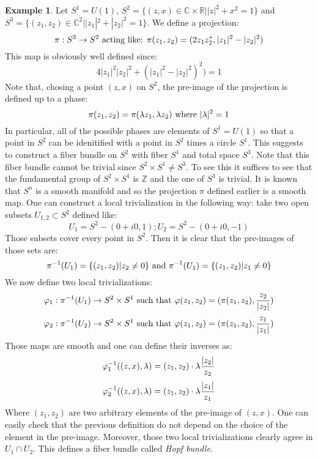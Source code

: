 \documentclass[12pt,a4paper]{report}
\theoremstyle{definition}
\theoremstyle{Theorem}
\theoremstyle{definition}
\newtheorem{Ex}[Def]{Example}
\theoremstyle{definition}
\begin{document}
	\begin{Ex}\label{Ex_3.1.3}
		Let $S^1=U(1)$, $S^2=\{(z,x)\in\mathbb{C}\times\mathbb{R}||z|^2+x^2=1\}$ and $S^3=\{(z_1,z_2)\in\mathbb{C}^2||z_1|^2+|z_2|^2=1\}$. We define a projection:
		$$\pi:S^3\rightarrow S^2\hbox{ acting like: }\pi(z_1,z_2)=(2z_1z_2^*,|z_1|^2-|z_2|^2)$$
		This map is obviously well defined since:
		$$4|z_1|^2|z_2|^2+(|z_1|^2-|z_2|^2)^2)=1$$
		Note that, chosing a point $(z,x)$ on $S^2$, the pre-image of the projection is defined up to a phase:
		$$\pi(z_1,z_2)=\pi(\lambda z_1,\lambda z_2)\hbox{ where }|\lambda|^2=1$$
		In particular, all of the possible phases are elements of $S^1=U(1)$ so that a point in $S^2$ can be idenitified with a point in $S^2$ times a circle $S^1$. This suggests to construct a fiber bundle on $S^2$ with fiber $S^1$ and total space $S^3$. Note that this fiber bundle cannot be trivial since $S^2\times S^1\neq S^3$. To see this it suffices to see that the fundamental group of $S^2\times S^1$ is $\mathbb{Z}$ and the one of $S^3$ is trivial.
		It is known that $S^n$ is a smooth manifold and so the projection $\pi$ defined earlier is a smooth map. One can construct a local trivialization in the following way: take two open subsets $U_{1,2}\subset S^2$ defined like:
		$$U_1=S^2-(0+i0,1);U_2=S^2-(0+i0,-1)$$
		Those subsets cover every point in $S^2$. Then it is clear that the pre-images of those sets are:
		$$\pi^{-1}(U_1)=\{(z_1,z_2)|z_2\neq 0\}\hbox{ and }\pi^{-1}(U_1)=\{(z_1,z_2)|z_1\neq 0\}$$
		We now define two local trivializations:
		$$\varphi_1:\pi^{-1}(U_1)\rightarrow S^2\times S^1\hbox{ such that }\varphi(z_1,z_2)=(\pi(z_1,z_2),{z_2\over |z_2|})$$
		$$\varphi_2:\pi^{-1}(U_2)\rightarrow S^2\times S^1\hbox{ such that }\varphi(z_1,z_2)=(\pi(z_1,z_2),{z_1\over |z_1|})$$
		Those maps are smooth and one can define their inverses as:
		$$\varphi_1^{-1}((z,x),\lambda)=(z_1,z_2)\cdot\lambda{|z_2|\over z_2}$$
		$$\varphi_2^{-1}((z,x),\lambda)=(z_1,z_2)\cdot\lambda{|z_1|\over z_1}$$
		Where $(z_1,z_2)$ are two arbitrary elements of the pre-image of $(z,x)$. One can easily check that the previous definition do not depend on the choice of the element in the pre-image. Moreover, those two local trivializations clearly agree in $U_1\cap U_2$. This defines a fiber bundle called \textit{Hopf bundle}.
	\end{Ex}
\end{document}
